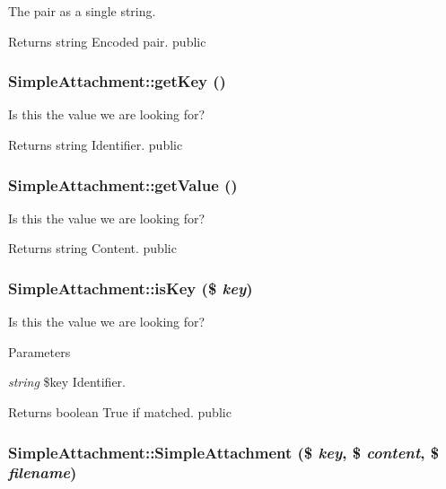 \label{class_simple_attachment_a42ee771da24f26645168f42447def83a}
The pair as a single string. \begin{DoxyReturn}{Returns}
string Encoded pair.  public 
\end{DoxyReturn}
\hypertarget{class_simple_attachment_a234c2497dfc092030a936f23c9f34484}{
\subsubsection[{getKey}]{\setlength{\rightskip}{0pt plus 5cm}SimpleAttachment::getKey ()}}
\label{class_simple_attachment_a234c2497dfc092030a936f23c9f34484}
Is this the value we are looking for? \begin{DoxyReturn}{Returns}
string Identifier.  public 
\end{DoxyReturn}
\hypertarget{class_simple_attachment_aa6ab36e0e77e134b86027413c87a7087}{
\subsubsection[{getValue}]{\setlength{\rightskip}{0pt plus 5cm}SimpleAttachment::getValue ()}}
\label{class_simple_attachment_aa6ab36e0e77e134b86027413c87a7087}
Is this the value we are looking for? \begin{DoxyReturn}{Returns}
string Content.  public 
\end{DoxyReturn}
\hypertarget{class_simple_attachment_aeae5164683f8bdee48fe3309d65a499f}{
\subsubsection[{isKey}]{\setlength{\rightskip}{0pt plus 5cm}SimpleAttachment::isKey (\$ {\em key})}}
\label{class_simple_attachment_aeae5164683f8bdee48fe3309d65a499f}
Is this the value we are looking for? 
\begin{DoxyParams}{Parameters}
\item[{\em string}]\$key Identifier. \end{DoxyParams}
\begin{DoxyReturn}{Returns}
boolean True if matched.  public 
\end{DoxyReturn}
\hypertarget{class_simple_attachment_a52aee178378d8a5ac82c62090c1e30a8}{
\subsubsection[{SimpleAttachment}]{\setlength{\rightskip}{0pt plus 5cm}SimpleAttachment::SimpleAttachment (\$ {\em key}, \/  \$ {\em content}, \/  \$ {\em filename})}}
